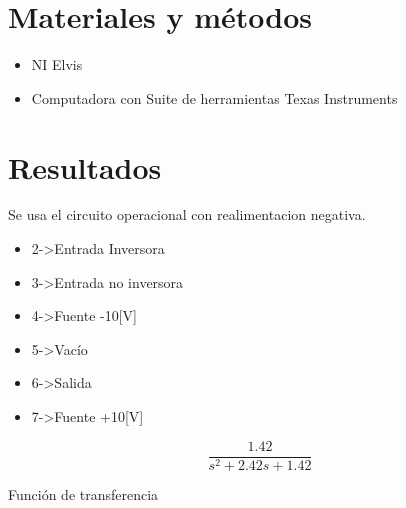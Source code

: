 \documentclass[]{article}
\begin{document}
\section{Materiales y métodos}

	\begin{itemize}
		\item NI Elvis
		\item Computadora con Suite de herramientas Texas Instruments
	\end{itemize}
	
\section{Resultados}



Se usa el circuito operacional con realimentacion negativa.\\

\begin{itemize}
	
	\item 2->Entrada Inversora
	\item 3->Entrada no inversora
	\item 4->Fuente -10[V]
	\item 5->Vacío
	\item 6->Salida
	\item 7->Fuente +10[V]
\end{itemize}

\begin{equation}
  \frac{1.42}{s^2+2.42s+1.42}
\end{equation}

Función de transferencia




\end{document}
